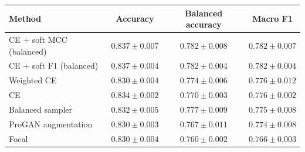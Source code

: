 \begin{tabular}{lccc}
\toprule
Method & Accuracy & Balanced accuracy & Macro F1\\
\midrule
CE + soft MCC (balanced) & $0.837 \pm 0.007$ & $0.782 \pm 0.008$ & $0.782 \pm 0.007$\\
CE + soft F1 (balanced) & $0.837 \pm 0.004$ & $0.782 \pm 0.004$ & $0.782 \pm 0.004$\\
Weighted CE & $0.830 \pm 0.004$ & $0.774 \pm 0.006$ & $0.776 \pm 0.012$\\
CE & $0.834 \pm 0.002$ & $0.770 \pm 0.003$ & $0.776 \pm 0.002$\\
Balanced sampler & $0.832 \pm 0.005$ & $0.777 \pm 0.009$ & $0.775 \pm 0.008$\\
ProGAN augmentation & $0.830 \pm 0.003$ & $0.767 \pm 0.011$ & $0.774 \pm 0.008$\\
Focal & $0.830 \pm 0.004$ & $0.760 \pm 0.002$ & $0.766 \pm 0.003$\\
\bottomrule
\end{tabular}
